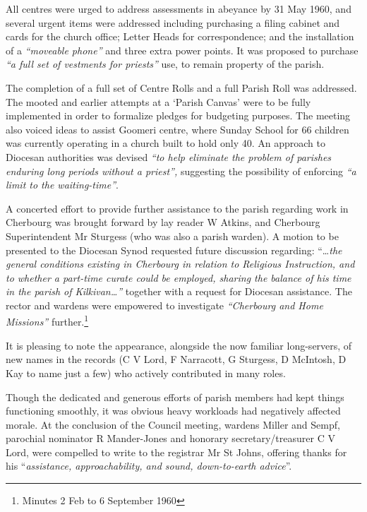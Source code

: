 All centres were urged to address assessments in abeyance by 31 May 1960, and several urgent items were addressed including purchasing a filing cabinet and cards for the church office; Letter Heads for correspondence; and the installation of a \emph{``moveable phone''} and three extra power points. It was proposed to purchase \emph{``a full set of vestments for priests''} use, to remain property of the parish.



The completion of a full set of Centre Rolls and a full Parish Roll was addressed. The mooted and earlier attempts at a `Parish Canvas' were to be fully implemented in order to formalize pledges for budgeting purposes. The meeting also voiced ideas to assist Goomeri centre, where Sunday School for 66 children was currently operating in a church built to hold only 40. An approach to Diocesan authorities was devised \emph{``to help eliminate the problem of parishes enduring long periods without a priest'',} suggesting the possibility of enforcing \emph{``a limit to the waiting-time''}.



A concerted effort to provide further assistance to the parish regarding work in Cherbourg was brought forward by lay reader W Atkins, and Cherbourg Superintendent Mr Sturgess (who was also a parish warden). A motion to be presented to the Diocesan Synod requested future discussion regarding: ``\ldots{}\emph{the general conditions existing in Cherbourg in relation to Religious Instruction, and to whether a part-time curate could be employed, sharing the balance of his time in the parish of Kilkivan\ldots''} together with a request for Diocesan assistance. The rector and wardens were empowered to investigate \emph{``Cherbourg and Home Missions''} further.\footnote{Minutes 2 Feb to 6 September 1960}


It is pleasing to note the appearance, alongside the now familiar long-servers, of new names in the records (C V Lord, F Narracott, G Sturgess, D McIntosh, D Kay to name just a few) who actively contributed in many roles.



Though the dedicated and generous efforts of parish members had kept things functioning smoothly, it was obvious heavy workloads had negatively affected morale. At the conclusion of the Council meeting, wardens Miller and Sempf, parochial nominator R Mander-Jones and honorary secretary/treasurer C V Lord, were compelled to write to the registrar Mr St Johns, offering thanks for his ``\emph{assistance, approachability, and sound, down-to-earth advice}''.



